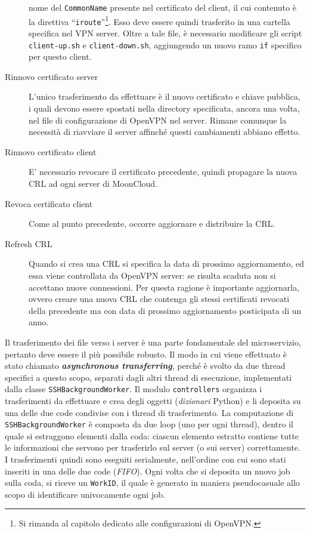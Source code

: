 \begin{description}
	nome del \texttt{CommonName} presente nel certificato del client, il cui
	contenuto è la direttiva ``\texttt{iroute}''\footnote{Si rimanda al capitolo dedicato
	alle configurazioni di OpenVPN.}. Esso deve essere quindi trasferito in una cartella
	specifica nel VPN server. Oltre a tale file, è necessario modificare gli script
	\texttt{client-up.sh} e \texttt{client-down.sh}, aggiungendo un nuovo ramo
	\texttt{if} specifico per questo client.
	\item[Rinnovo certificato server]L'unico trasferimento da effettuare è il nuovo
	certificato e chiave pubblica, i quali devono essere spostati nella directory
	specificata, ancora una volta, nel file di configurazione di OpenVPN nel server.
	Rimane comunque la necessità di riavviare il server affinché questi cambiamenti abbiano
	effetto.
	\item[Rinnovo certificato client]E' necessario revocare il certificato precedente,
	quindi propagare la nuova CRL ad ogni server di MoonCloud.
	\item[Revoca certificato client]Come al punto precedente, occorre aggiornare e distribuire la
	CRL.
	\item[Refresh CRL]Quando si crea una CRL si specifica la data di prossimo aggiornamento,
	ed essa viene controllata da OpenVPN server: se risulta scaduta non si accettano nuove
	connessioni. Per questa ragione è importante aggiornarla, ovvero creare una nuova
	CRL che contenga gli stessi certificati revocati della precedente ma con
	data di prossimo aggiornamento posticipata di un anno.
\end{description}

Il trasferimento dei file verso i server è una parte fondamentale del microservizio,
pertanto deve essere il più possibile robusto.
Il modo in cui viene effettuato è stato chiamato \textbf{\textit{asynchronous transferring}},
perché è svolto da due thread specifici a questo scopo, separati dagli altri thread di
esecuzione, implementati dalla classe \texttt{SSHBackgroundWorker}.
Il modulo \texttt{controllers} organizza i trasferimenti da effettuare e crea degli
oggetti (\textit{dizionari} Python) e li deposita su una delle due code condivise con i
thread di trasferimento.
La computazione di \texttt{SSHBackgroundWorker} è composta da due loop (uno per ogni thread), dentro
il quale si estraggono elementi dalla coda: ciascun elemento estratto contiene tutte le informazioni
che servono per trasferirlo sul server (o sui server) correttamente. I trasferimenti
quindi sono eseguiti serialmente, nell'ordine con cui sono stati inseriti
in una delle due code (\textit{FIFO}).
Ogni volta che si deposita un nuovo job sulla coda, si riceve un \texttt{WorkID}, il quale
è generato in maniera pseudocasuale allo scopo di identificare univocamente ogni job.

